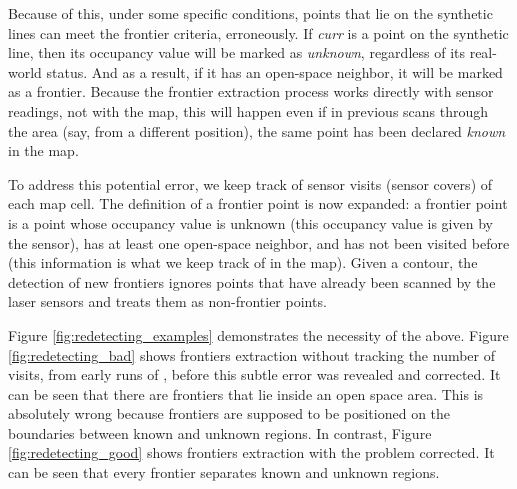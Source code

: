    Because of this, under some specific conditions, points that lie on the synthetic lines
    can meet the frontier criteria, erroneously. If \textit{curr} is a point on the synthetic line, 
    then its occupancy value will be marked as \textit{unknown}, regardless of its real-world status. And as a result, if it has an open-space neighbor, it will be marked as a frontier. Because
    the frontier extraction process works directly with sensor readings, not with the map, this
    will happen even if in previous scans through the area (say, from a different position), the same point has  been declared \textit{known} in the map. 
 
 
    To address this potential error, we keep track of sensor visits (sensor covers) of each map cell. %
        The
        definition of a frontier point is now expanded: a frontier point is a point
        whose occupancy value is unknown (this occupancy value is given by the sensor), has at least one open-space neighbor, and has not been visited before (this information is what we keep track of in the map). Given a contour, the detection of new frontiers ignores
        points that have already been scanned by the laser sensors and treats them as
        non-frontier points.

	Figure \ref{fig:redetecting_examples} demonstrates the necessity of the above.     Figure \ref{fig:redetecting_bad} shows frontiers extraction
	    without tracking the number of visits, from early runs of \FFD, before this subtle error was revealed and corrected. It can be seen that there are frontiers that lie inside
	    	an open space area. This is absolutely wrong because frontiers are supposed to
	    	be positioned on the boundaries between known and unknown regions. 	
	 In
	contrast, Figure \ref{fig:redetecting_good} shows frontiers extraction with
	the problem corrected. It can be seen that every frontier
	separates known and unknown regions.
	
